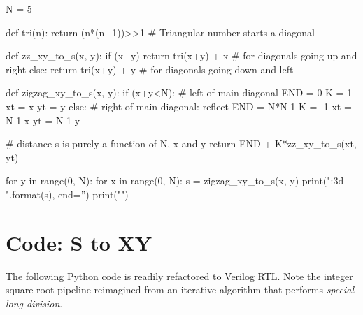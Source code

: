\documentclass[10pt]{article}
\theoremstyle{theorem}
\begin{document}
\begin{python}
N = 5

def tri(n):
    return (n*(n+1))>>1 # Triangular number starts a diagonal

def zz_xy_to_s(x, y):
    if (x+y)%
        return tri(x+y) + x # for diagonals going up and right
    else:
        return tri(x+y) + y # for diagonals going down and left

def zigzag_xy_to_s(x, y):
    if (x+y<N): # left of main diagonal
        END = 0
        K = 1
        xt = x
        yt = y
    else:       # right of main diagonal: reflect
        END = N*N-1
        K = -1
        xt = N-1-x
        yt = N-1-y

    # distance s is purely a function of N, x and y
    return END + K*zz_xy_to_s(xt, yt)

for y in range(0, N):
    for x in range(0, N):
        s = zigzag_xy_to_s(x, y)
        print("{:3d} ".format(s), end='')
    print("")
\end{python}


\section{Code: S to XY}

The following Python code is readily refactored to Verilog RTL. Note the
integer square root pipeline reimagined from an iterative algorithm
\cite{intsqrt} that performs \textit{special long division}.
\end{document}
